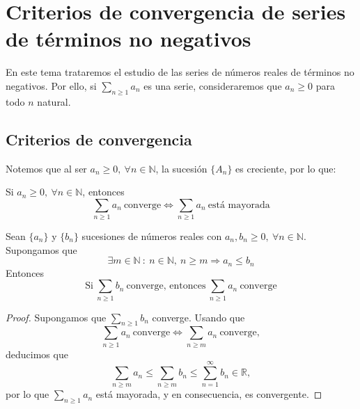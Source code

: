 \chapter{Criterios de convergencia de series de términos no negativos}

En este tema trataremos el estudio de las series de números reales de términos no negativos. Por ello, si $\displaystyle\sum_{n \geq 1} a_n$ es una serie, consideraremos que $a_n \geq 0$ para todo $n$ natural.


\section{Criterios de convergencia}
Notemos que al ser $a_n \geq 0, ~ \forall n \in \mathbb{N}$, la sucesión $\{A_n\}$ es creciente, por lo que:
\begin{prop}
    Si $a_n \geq 0, ~ \forall n \in \mathbb{N}$, entonces
    \begin{equation*}
        \displaystyle\sum_{n \geq 1} a_n ~ \text{converge} \Longleftrightarrow  \displaystyle\sum_{n \geq 1} a_n ~ \text{está mayorada}
    \end{equation*}
\end{prop}

\begin{prop}
    Sean $\{a_n\}$ y $\{b_n\}$ sucesiones de números reales con $a_n, b_n \geq 0, ~ \forall n \in \mathbb{N}$.
    Supongamos que
    \begin{equation*}
        \exists m \in \mathbb{N} ~:~ n \in \mathbb{N}, ~ n \geq m \Longrightarrow a_n \leq b_n
    \end{equation*}
    Entonces
    \begin{equation*}
        \text{Si} ~\displaystyle\sum_{n \geq 1} b_n ~ \text{converge, entonces} ~ \displaystyle\sum_{n \geq 1} a_n ~ \text{converge}
    \end{equation*}
\end{prop}
\begin{proof}
    Supongamos que $\displaystyle\sum_{n \geq 1} b_n$ converge. Usando que
    \begin{equation*}
        \displaystyle\sum_{n \geq 1} a_n ~ \text{converge} \Longleftrightarrow \displaystyle\sum_{n \geq m} a_n ~ \text{converge},
    \end{equation*}
    deducimos que
    \begin{equation*}
        \displaystyle\sum_{n \geq m} a_n \leq \displaystyle\sum_{n \geq m} b_n \leq \displaystyle\sum_{n = 1}^{\infty} b_n \in \mathbb{R},
    \end{equation*}
    por lo que $\displaystyle\sum_{n \geq 1} a_n$ está mayorada, y en consecuencia, es convergente.
\end{proof}

